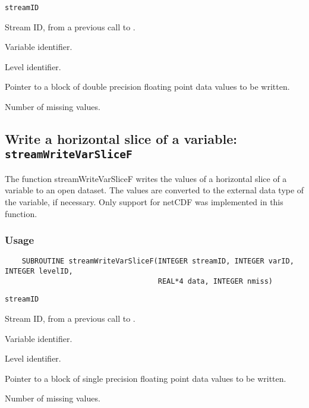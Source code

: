 \hspace*{4mm}\begin{minipage}[]{15cm}
\begin{deflist}{\tt streamID\ }
\item[{\tt streamID}]
Stream ID, from a previous call to {}.
\item[{\tt varID}]
Variable identifier.
\item[{\tt levelID}]
Level identifier.
\item[{\tt data}]
Pointer to a block of double precision floating point data values to be written.
\item[{\tt nmiss}]
Number of missing values.

\end{deflist}
\end{minipage}


\subsection{Write a horizontal slice of a variable: {\tt streamWriteVarSliceF}}
\label{streamWriteVarSliceF}

The function streamWriteVarSliceF writes the values of a horizontal slice of a variable to an open dataset.
The values are converted to the external data type of the variable, if necessary.
Only support for netCDF was implemented in this function.
\subsubsection*{Usage}

\begin{verbatim}
    SUBROUTINE streamWriteVarSliceF(INTEGER streamID, INTEGER varID, INTEGER levelID, 
                                    REAL*4 data, INTEGER nmiss)
\end{verbatim}

\hspace*{4mm}\begin{minipage}[]{15cm}
\begin{deflist}{\tt streamID\ }
\item[{\tt streamID}]
Stream ID, from a previous call to {}.
\item[{\tt varID}]
Variable identifier.
\item[{\tt levelID}]
Level identifier.
\item[{\tt data}]
Pointer to a block of single precision floating point data values to be written.
\item[{\tt nmiss}]
Number of missing values.

\end{deflist}
\end{minipage}


